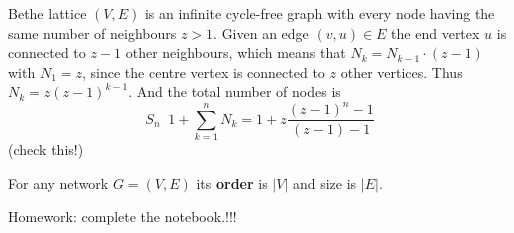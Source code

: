 \documentclass[a4paper]{article}
\newcommand{\brac}[1]{{\left ( #1 \right )}}
\newcommand{\abs}[1]{{\left | #1 \right |}}
\newcommand{\defn}{\mathop{\overset{\Delta}{=}}\nolimits}
\begin{document}
Bethe lattice $(V,E)$ is an infinite cycle-free graph with every node having the same number of neighbours $z > 1$.
Given an edge $(v,u)\in E$ the end vertex $u$ is connected to $z-1$ other neighbours, which means that $N_k = N_{k-1}\cdot (z-1)$ with $N_1 = z$, since the centre vertex is connected to $z$ other vertices.
Thus $N_k = z \brac{z-1}^{k-1}$.
And the total number of nodes is \[S_n \defn 1+\sum_{k = 1}^n N_k = 1 + z \frac{\brac{z-1}^n-1}{(z-1)-1}\] (check this!)

For any network $G=(V,E)$ its \textbf{order} is $\abs{V}$ and size is $\abs{E}$.


Homework: complete the notebook.!!!
\end{document}
